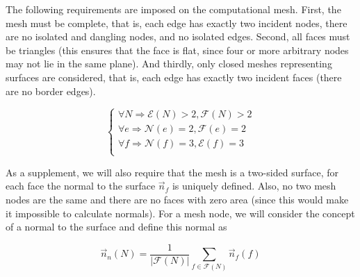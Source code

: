 \documentclass[
11pt,%
tightenlines,%
twoside,%
onecolumn,%
nofloats,%
nobibnotes,%
nofootinbib,%
superscriptaddress,%
noshowpacs,%
centertags]%
{revtex4-2}
\begin{document}
The following requirements are imposed on the computational mesh.
First, the mesh must be complete, that is, each edge has exactly two incident nodes, there are no isolated and dangling nodes, and no isolated edges.
Second, all faces must be triangles (this ensures that the face is flat, since four or more arbitrary nodes may not lie in the same plane).
And thirdly, only closed meshes representing surfaces are considered, that is, each edge has exactly two incident faces (there are no border edges).

\begin{equation}\label{eq_arch}
\begin{cases}
\forall N \Rightarrow \mathscr{E}(N) > 2, \mathscr{F}(N) > 2 \\
\forall e \Rightarrow \mathscr{N}(e) = 2 , \mathscr{F}(e) = 2 \\
\forall f \Rightarrow \mathscr{N}(f) = 3 , \mathscr{E}(f) = 3 \\
\end{cases}
\end{equation}

As a supplement, we will also require that the mesh is a two-sided surface, for each face the normal to the surface $\vec{n}_f$ is uniquely defined.
Also, no two mesh nodes are the same and there are no faces with zero area (since this would make it impossible to calculate normals).
For a mesh node, we will consider the concept of a normal to the surface and define this normal as

\begin{equation}
\vec{n}_n(N) = \frac{1}{|\mathscr{F}(N)|} \sum_{f \in \mathscr{F}(N)}{\vec{n}_f(f)}
\end{equation}
\end{document}
